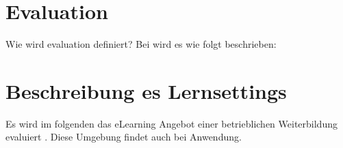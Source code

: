 \documentclass[12pt, bibliography=totoc]{scrartcl}
\begin{document}
%
\tableofcontents
\setcounter{page}{1}
\pagebreak

\section{Evaluation}\label{evaluation}

Wie wird evaluation definiert? Bei \textcite{askun2007web} wird es wie
folgt beschrieben:

\section{Beschreibung es
Lernsettings}\label{beschreibung-es-lernsettings}

Es wird im folgenden das eLearning Angebot einer betrieblichen
Weiterbildung evaluiert \autocite{Helmke2008}. Diese Umgebung findet
auch bei \textcite{ChenCouse200917} Anwendung.

\pagebreak
\printbibliography
\pagebreak
%
%
\end{document}
